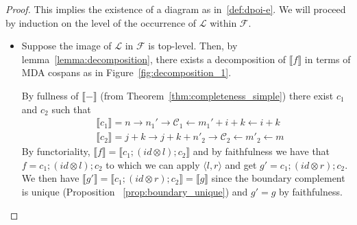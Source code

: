 \begin{proof}
This implies the existence of a diagram as in~\ref{def:dpoi-e}.
We will proceed by induction on the level of the occurrence of $\mathcal{L}$ within $\mathcal{F}$.
\begin{itemize}
	\item Suppose the image of $\mathcal{L}$ in $\mathcal{F}$ is top-level.
		  Then, by lemma~\ref{lemma:decomposition}, there exists a decomposition of $\llbracket f \rrbracket$ in terms of MDA cospans as in Figure~\ref{fig:decomposition_1}.

		By fullness of $\llbracket - \rrbracket$ (from Theorem~\ref{thm:completeness_simple}) there exist $c_{1}$ and $c_{2}$ such that 
		\begin{align*}
		&\llbracket c_{1} \rrbracket = n \xrightarrow{} n_{1}' \xrightarrow{} \mathcal{C}_{1} \xleftarrow{} m_{1}' + i + k \xleftarrow{} i + k\\
        &\llbracket c_{2} \rrbracket = j + k \xrightarrow{} j + k + n'_{2} \xrightarrow{} \mathcal{C}_{2} \xleftarrow{} m'_{2} \xleftarrow{} m
        \end{align*}
		By functoriality, $\llbracket f \rrbracket = \llbracket c_{1};(id \otimes l);c_{2} \rrbracket$ and by faithfulness we have that $f = c_{1};(id \otimes l);c_{2}$ to which we can apply $\langle l, r \rangle$ and get $g' = c_{1};(id \otimes r);c_{2}$.
		We then have $\llbracket g' \rrbracket = \llbracket c_{1};(id \otimes r);c_{2} \rrbracket =  \llbracket g \rrbracket$ since the boundary complement is unique (Proposition ~\ref{prop:boundary_unique}) and $g' = g$ by faithfulness.


\end{itemize}
\end{proof}
